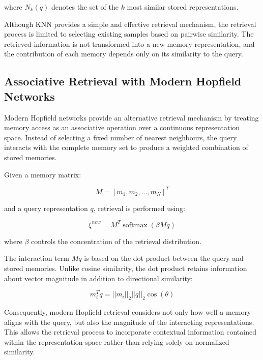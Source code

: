where $N_k(q)$ denotes the set of the $k$ most similar stored representations.

Although KNN provides a simple and effective retrieval mechanism, the retrieval process is limited to selecting existing samples based on pairwise similarity. 
The retrieved information is not transformed into a new memory representation, and the contribution of each memory depends only on its similarity to the query.

\subsection{Associative Retrieval with Modern Hopfield Networks}

Modern Hopfield networks provide an alternative retrieval mechanism by treating memory access as an associative operation over a continuous representation space. 
Instead of selecting a fixed number of nearest neighbours, the query interacts with the complete memory set to produce a weighted combination of stored memories.

Given a memory matrix:

\begin{equation}
    M=[m_1,m_2,...,m_N]^T
\end{equation}

and a query representation $q$, retrieval is performed using:

\begin{equation}
    \xi^{new}
    =
    M^T \operatorname{softmax}(\beta Mq)
\end{equation}

where $\beta$ controls the concentration of the retrieval distribution.

The interaction term $Mq$ is based on the dot product between the query and stored memories. 
Unlike cosine similarity, the dot product retains information about vector magnitude in addition to directional similarity:

\begin{equation}
    m_i^Tq = ||m_i||_2||q||_2\cos(\theta)
\end{equation}

Consequently, modern Hopfield retrieval considers not only how well a memory aligns with the query, but also the magnitude of the interacting representations. 
This allows the retrieval process to incorporate contextual information contained within the representation space rather than relying solely on normalized similarity.

